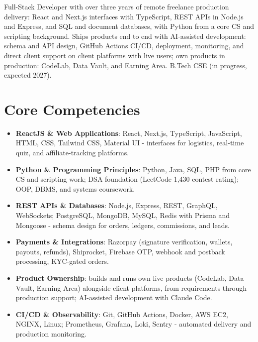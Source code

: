 \documentclass[11pt,a4paper,sans]{moderncv}
\begin{document}
\makecvtitle


\vspace{6pt}
\small{Full-Stack Developer with over three years of remote freelance production delivery: React and Next.js interfaces with TypeScript, REST APIs in Node.js and Express, and SQL and document databases, with Python from a core CS and scripting background. Ships products end to end with AI-assisted development: schema and API design, GitHub Actions CI/CD, deployment, monitoring, and direct client support on client platforms with live users; own products in production: CodeLab, Data Vault, and Earning Area. B.Tech CSE (in progress, expected 2027).}


\section{Core Competencies}
\vspace{1pt}
\begin{itemize}

\item \textbf{ReactJS \& Web Applications}: React, Next.js, TypeScript, JavaScript, HTML, CSS, Tailwind CSS, Material UI - interfaces for logistics, real-time quiz, and affiliate-tracking platforms.

\item \textbf{Python \& Programming Principles}: Python, Java, SQL, PHP from core CS and scripting work; DSA foundation (LeetCode 1,430 contest rating); OOP, DBMS, and systems coursework.

\item \textbf{REST APIs \& Databases}: Node.js, Express, REST, GraphQL, WebSockets; PostgreSQL, MongoDB, MySQL, Redis with Prisma and Mongoose - schema design for orders, ledgers, commissions, and leads.

\item \textbf{Payments \& Integrations}: Razorpay (signature verification, wallets, payouts, refunds), Shiprocket, Firebase OTP, webhook and postback processing, KYC-gated orders.

\item \textbf{Product Ownership}: builds and runs own live products (CodeLab, Data Vault, Earning Area) alongside client platforms, from requirements through production support; AI-assisted development with Claude Code.

\item \textbf{CI/CD \& Observability}: Git, GitHub Actions, Docker, AWS EC2, NGINX, Linux; Prometheus, Grafana, Loki, Sentry - automated delivery and production monitoring.

\end{itemize}
\end{document}
